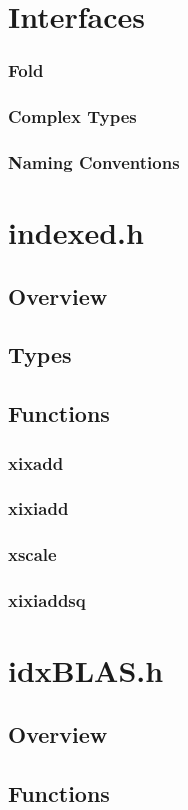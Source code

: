 \documentclass[12pt]{article}
\theoremstyle{plain}
\begin{document}
\section{Interfaces}
  \subsubsection{Fold}
  \subsubsection{Complex Types}
  \subsubsection{Naming Conventions}
\section{indexed.h}
  \subsection{Overview}
  \subsection{Types}
  \subsection{Functions}
    \subsubsection{xixadd}
    \subsubsection{xixiadd}
    \subsubsection{xscale}
    \subsubsection{xixiaddsq}
\section{idxBLAS.h}
  \subsection{Overview}
  \subsection{Functions}
\end{document}
